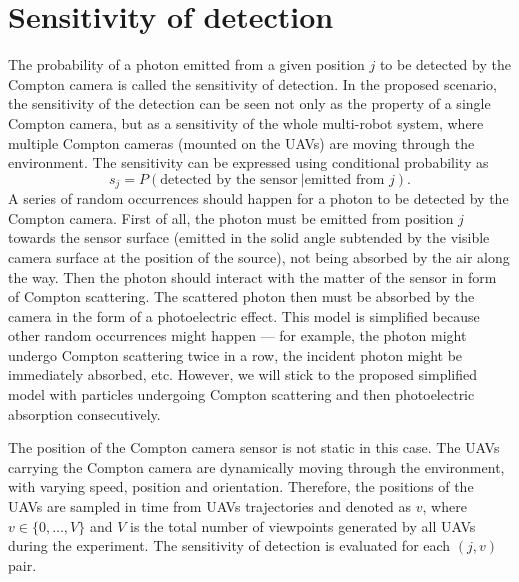 
\section{Sensitivity of detection}%
\label{sec:sensitivity}
The probability of a photon emitted from a given position $j$ to be detected by the Compton camera is called the sensitivity of detection.
In the proposed scenario, the sensitivity of the detection can be seen not only as the property of a single Compton camera, but as a sensitivity of the whole multi-robot system, where multiple Compton cameras (mounted on the \ac{UAV}s) are moving through the environment.
The sensitivity can be expressed using conditional probability as 
\begin{equation}
  s_{j} =  P(\textrm{detected by the sensor}\ | \textrm{emitted from } j).
\end{equation}
A series of random occurrences should happen for a photon to be detected by the Compton camera.
First of all, the photon must be emitted from position $j$ towards the sensor surface (emitted in the solid angle subtended by the visible camera surface at the position of the source), not being absorbed by the air along the way.
Then the photon should interact with the matter of the sensor in form of Compton scattering.
The scattered photon then must be absorbed by the camera in the form of a photoelectric effect.
This model is simplified because other random occurrences might happen --- for example, the photon might undergo Compton scattering twice in a row, the incident photon might be immediately absorbed, etc.
However, we will stick to the proposed simplified model with particles undergoing Compton scattering and then photoelectric absorption consecutively.

The position of the Compton camera sensor is not static in this case. 
The \ac{UAV}s carrying the Compton camera are dynamically moving through the environment, with varying speed, position and orientation.
Therefore, the positions of the \ac{UAV}s are sampled in time from \ac{UAV}s trajectories and denoted as $v$, where $v \in \{0, \dots , V\}$ and $V$ is the total number of viewpoints generated by all \ac{UAV}s during the experiment.
The sensitivity of detection is evaluated for each $(j,v)$ pair. %

